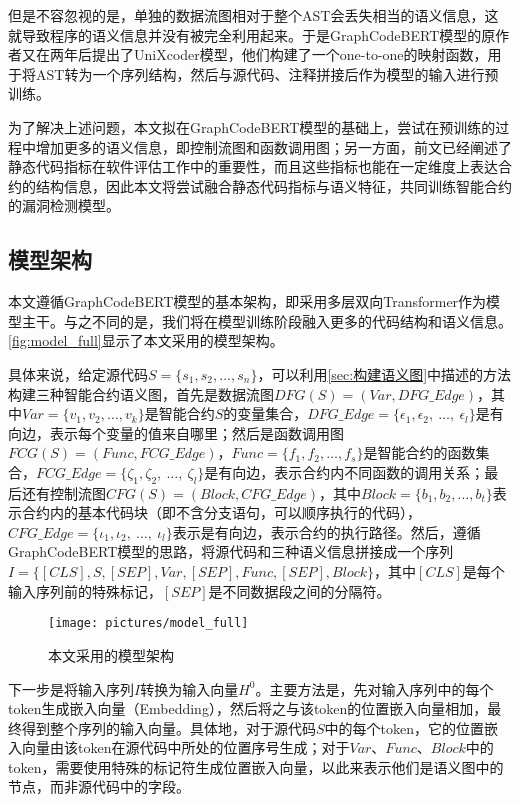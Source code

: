 但是不容忽视的是，单独的数据流图相对于整个AST会丢失相当的语义信息，这就导致程序的语义信息并没有被完全利用起来。于是GraphCodeBERT模型的原作者又在两年后提出了UniXcoder模型\cite{unixcoder}，他们构建了一个one-to-one的映射函数，用于将AST转为一个序列结构，然后与源代码、注释拼接后作为模型的输入进行预训练。

为了解决上述问题，本文拟在GraphCodeBERT模型的基础上，尝试在预训练的过程中增加更多的语义信息，即控制流图和函数调用图；另一方面，前文已经阐述了静态代码指标在软件评估工作中的重要性，而且这些指标也能在一定维度上表达合约的结构信息，因此本文将尝试融合静态代码指标与语义特征，共同训练智能合约的漏洞检测模型。

\subsection{模型架构}
\label{sec:模型架构}
本文遵循GraphCodeBERT模型的基本架构，即采用多层双向Transformer作为模型主干。与之不同的是，我们将在模型训练阶段融入更多的代码结构和语义信息。\autoref{fig:model_full}显示了本文采用的模型架构。%


具体来说，给定源代码$S=\{s_{1},s_{2},...,s_{n}\}$，可以利用\autoref{sec:构建语义图}中描述的方法构建三种智能合约语义图，首先是数据流图$DFG(S)=(Var,DFG\_Edge)$，其中$Var=\{v_1,v_2,\ldots,v_k\}$是智能合约$S$的变量集合，$DFG\_Edge=\{\epsilon_1,\epsilon_2,~\ldots,~\epsilon_l\}$是有向边，表示每个变量的值来自哪里；然后是函数调用图$FCG(S)=(Func,FCG\_Edge)$，$Func=\{f_1,f_2,\ldots,f_s\}$是智能合约的函数集合，$FCG\_Edge=\{\zeta_1,\zeta_2,~\ldots,~\zeta_l\}$是有向边，表示合约内不同函数的调用关系；最后还有控制流图$CFG(S)=(Block,CFG\_Edge)$，其中$Block=\{b_1,b_2,\ldots,b_t\}$表示合约内的基本代码块（即不含分支语句，可以顺序执行的代码），$CFG\_Edge=\{\iota_1,\iota_2,~\ldots,~\iota_l\}$表示是有向边，表示合约的执行路径。然后，遵循GraphCodeBERT模型的思路，将源代码和三种语义信息拼接成一个序列$I=\{[CLS],S,[SEP],Var,[SEP],Func,[SEP],Block\}$，其中$[CLS]$是每个输入序列前的特殊标记，$[SEP]$是不同数据段之间的分隔符。
\begin{figure}[htbp]
    \centering
    \texttt{[image: pictures/model\_full]}
    \caption{\label{fig:model_full}本文采用的模型架构}
\end{figure}

下一步是将输入序列$I$转换为输入向量$H^0$。主要方法是，先对输入序列中的每个token生成嵌入向量（Embedding），然后将之与该token的位置嵌入向量相加，最终得到整个序列的输入向量。具体地，对于源代码$S$中的每个token，它的位置嵌入向量由该token在源代码中所处的位置序号生成；对于$Var$、$Func$、$Block$中的token，需要使用特殊的标记符生成位置嵌入向量，以此来表示他们是语义图中的节点，而非源代码中的字段。

